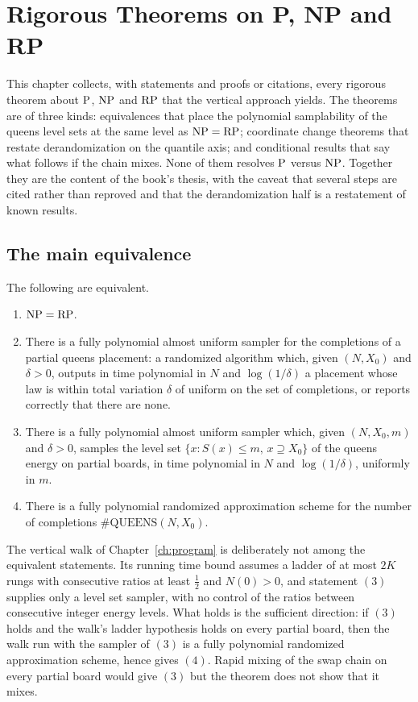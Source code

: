 \chapter{Rigorous Theorems on P, NP and RP}
\label{ch:theorems}

This chapter collects, with statements and proofs or citations, every rigorous theorem about $\mathrm{P}$, $\mathrm{NP}$ and $\mathrm{RP}$ that the vertical approach yields. The theorems are of three kinds: equivalences that place the polynomial samplability of the queens level sets at the same level as $\mathrm{NP} = \mathrm{RP}$; coordinate change theorems that restate derandomization on the quantile axis; and conditional results that say what follows if the chain mixes. None of them resolves $\mathrm{P}$ versus $\mathrm{NP}$. Together they are the content of the book's thesis, with the caveat that several steps are cited rather than reproved and that the derandomization half is a restatement of known results.

\section{The main equivalence}

\begin{theorem}
\label{thm:mainequiv}
The following are equivalent.
\begin{enumerate}
\item $\mathrm{NP} = \mathrm{RP}$.
\item There is a fully polynomial almost uniform sampler for the completions of a partial queens placement: a randomized algorithm which, given $(N, X_0)$ and $\delta > 0$, outputs in time polynomial in $N$ and $\log(1/\delta)$ a placement whose law is within total variation $\delta$ of uniform on the set of completions, or reports correctly that there are none.
\item There is a fully polynomial almost uniform sampler which, given $(N, X_0, m)$ and $\delta > 0$, samples the level set $\{ x : S(x) \le m, \, x \supseteq X_0 \}$ of the queens energy on partial boards, in time polynomial in $N$ and $\log(1/\delta)$, uniformly in $m$.
\item There is a fully polynomial randomized approximation scheme for the number of completions $\#\mathrm{QUEENS}(N, X_0)$.
\end{enumerate}
\end{theorem}

The vertical walk of Chapter~\ref{ch:program} is deliberately not among the equivalent statements. Its running time bound assumes a ladder of at most $2K$ rungs with consecutive ratios at least $\tfrac12$ and $N(0) > 0$, and statement $(3)$ supplies only a level set sampler, with no control of the ratios between consecutive integer energy levels. What holds is the sufficient direction: if $(3)$ holds and the walk's ladder hypothesis holds on every partial board, then the walk run with the sampler of $(3)$ is a fully polynomial randomized approximation scheme, hence gives $(4)$. Rapid mixing of the swap chain on every partial board would give $(3)$ but the theorem does not show that it mixes.

